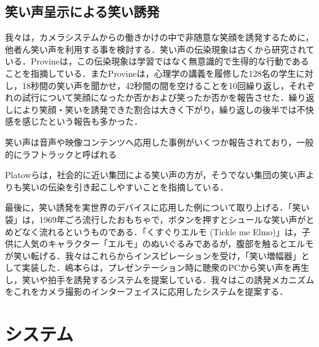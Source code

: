 \documentclass[submit,techreq]{ec2014}
\begin{document}

\subsection{笑い声呈示による笑い誘発}

我々は，カメラシステムからの働きかけの中で非随意な笑顔を誘発するために，他者ん笑い声を利用する事を検討する．笑い声の伝染現象は古くから研究されている．Provineは，この伝染現象は学習ではなく無意識的で生得的な行動であることを指摘している\cite{provine1996laughter}．またProvineは，心理学の講義を履修した128名の学生に対し，18秒間の笑い声を聞かせ，42秒間の間を空けることを10回繰り返し，それぞれの試行について笑顔になったか否かおよび笑ったか否かを報告させた\cite{provine1992contagious}．繰り返しにより笑顔・笑いを誘発できた割合は大きく下がり，繰り返しの後半では不快感を感じたという報告も多かった． 

笑い声は音声や映像コンテンツへ応用した事例がいくつか報告されており，一般的にラフトラックと呼ばれる

Platowらは，社会的に近い集団による笑い声の方が，そうでない集団の笑い声よりも笑いの伝染を引き起こしやすいことを指摘している\cite{platow41n}．

最後に，笑い誘発を実世界のデバイスに応用した例について取り上げる．「笑い袋」は，1969年ごろ流行したおもちゃで，ボタンを押すとシュールな笑い声がとめどなく流れるというものである．「くすぐりエルモ (Tickle me Elmo)」\cite{ticklemeelmo}は，子供に人気のキャラクター「エルモ」のぬいぐるみであるが，腹部を触るとエルモが笑い転げる．我々はこれらからインスピレーションを受け，「笑い増幅器」として実装した\cite{fukushima2010}．嶋本らは，プレゼンテーション時に聴衆のPCから笑い声を再生し，笑いや拍手を誘発するシステムを提案している．我々はこの誘発メカニズムをこれをカメラ撮影のインターフェイスに応用したシステムを提案する．

\section{システム}
\end{document}
